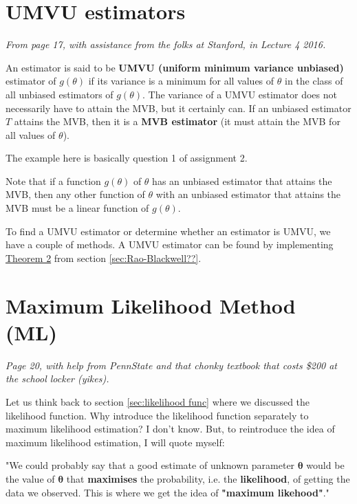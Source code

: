\section{UMVU estimators}\label{sec:UMVU ests}

\textit{From page 17, with assistance from the folks at Stanford, \autocite{stanford} in Lecture 4 2016.}

An estimator is said to be \textbf{UMVU (uniform minimum variance unbiased)} estimator of \(g(\theta)\) if its variance is a minimum for all values of \(\theta\) in the class of all unbiased estimators of \(g(\theta)\). 
The variance of a UMVU estimator does not necessarily have to attain the MVB, but it certainly can.
If an unbiased estimator \(T\) attains the MVB, then it is a \textbf{MVB estimator} (it must attain the MVB for all values of \(\theta\)). 

\begin{example}
    The example here is basically question 1 of assignment 2.
\end{example}

Note that if a function \(g(\theta)\) of \(\theta\) has an unbiased estimator that attains the MVB, then any other function of \(\theta\) with an unbiased estimator that attains the MVB must be a linear function of \(g(\theta)\). 

\bigskip

To find a UMVU estimator or determine whether an estimator is UMVU, we have a couple of methods. 
A UMVU estimator can be found by implementing \hyperref[thm:thm 2 UMVU]{Theorem 2} from section \ref{sec:Rao-Blackwell??}. 

\section{Maximum Likelihood Method (ML)}\label{sec:ML method}

\textit{Page 20, with help from PennState and that chonky textbook that costs \$200 at the school locker (yikes). \autocite{penn415} \autocite{rice}}

Let us think back to section \ref{sec:likelihood func} where we discussed the likelihood function. 
Why introduce the likelihood function separately to maximum likelihood estimation? 
I don't know. But, to reintroduce the idea of maximum likelihood estimation, I will quote myself:

\bigskip

"We could probably say that a good estimate of unknown parameter \(\bm{\theta}\) would be the value of \(\bm{\theta}\) that \textbf{maximises} the probability, i.e. the \textbf{likelihood}, of getting the data we observed. 
This is where we get the idea of \textbf{"maximum likehood"}." 

